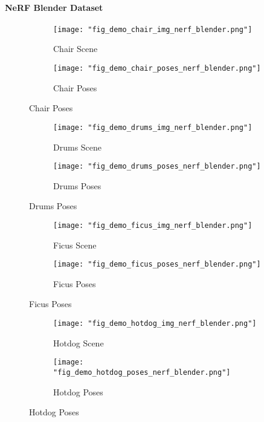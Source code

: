 \paragraph{NeRF Blender Dataset}
\begin{figure}
    \centering
        \begin{subfigure}{0.48\linewidth}
            \texttt{[image: "fig\_demo\_chair\_img\_nerf\_blender.png"]}
            \caption{Chair Scene}
        \end{subfigure}
        \begin{subfigure}{0.48\linewidth}
            \texttt{[image: "fig\_demo\_chair\_poses\_nerf\_blender.png"]}
            \caption{Chair Poses}
        \end{subfigure}
\end{figure}

\begin{figure}
    \centering
        \begin{subfigure}{0.48\linewidth}
            \texttt{[image: "fig\_demo\_drums\_img\_nerf\_blender.png"]}
            \caption{Drums Scene}
        \end{subfigure}
        \begin{subfigure}{0.48\linewidth}
            \texttt{[image: "fig\_demo\_drums\_poses\_nerf\_blender.png"]}
            \caption{Drums Poses}
        \end{subfigure}
\end{figure}


\begin{figure}
    \centering
        \begin{subfigure}{0.48\linewidth}
            \texttt{[image: "fig\_demo\_ficus\_img\_nerf\_blender.png"]}
            \caption{Ficus Scene}
        \end{subfigure}
        \begin{subfigure}{0.48\linewidth}
            \texttt{[image: "fig\_demo\_ficus\_poses\_nerf\_blender.png"]}
            \caption{Ficus Poses}
        \end{subfigure}
\end{figure}


\begin{figure}
    \centering
        \begin{subfigure}{0.48\linewidth}
            \texttt{[image: "fig\_demo\_hotdog\_img\_nerf\_blender.png"]}
            \caption{Hotdog Scene}
        \end{subfigure}
        \begin{subfigure}{0.48\linewidth}
            \texttt{[image: "fig\_demo\_hotdog\_poses\_nerf\_blender.png"]}
            \caption{Hotdog Poses}
        \end{subfigure}
\end{figure}


